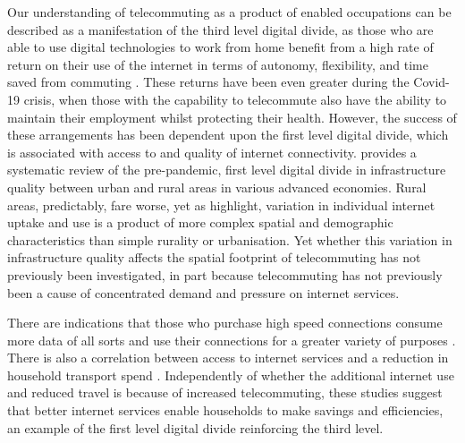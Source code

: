 \documentclass[Royal,times,sageh]{sagej}
\begin{document}
Our understanding of telecommuting as a product of enabled occupations
can be described as a manifestation of the third level digital divide,
as those who are able to use digital technologies to work from home
benefit from a high rate of return on their use of the internet in terms
of autonomy, flexibility, and time saved from commuting
\citep{peters2004employees, siha2006telecommuting, singh2013modeling}.
These returns have been even greater during the Covid-19 crisis, when
those with the capability to telecommute also have the ability to
maintain their employment whilst protecting their health. However, the
success of these arrangements has been dependent upon the first level
digital divide, which is associated with access to and quality of
internet connectivity. \citet{SALEMINK2017360} provides a systematic
review of the pre-pandemic, first level digital divide in infrastructure
quality between urban and rural areas in various advanced economies.
Rural areas, predictably, fare worse, yet as \citet{blank2018local}
highlight, variation in individual internet uptake and use is a product
of more complex spatial and demographic characteristics than simple
rurality or urbanisation. Yet whether this variation in infrastructure
quality affects the spatial footprint of telecommuting has not
previously been investigated, in part because telecommuting has not
previously been a cause of concentrated demand and pressure on internet
services.

There are indications that those who purchase high speed connections
consume more data of all sorts and use their connections for a greater
variety of purposes \citep{hauge2011consumer}. There is also a
correlation between access to internet services and a reduction in
household transport spend \citep{bris2017ict}. Independently of whether
the additional internet use and reduced travel is because of increased
telecommuting, these studies suggest that better internet services
enable households to make savings and efficiencies, an example of the
first level digital divide reinforcing the third level.
\end{document}
